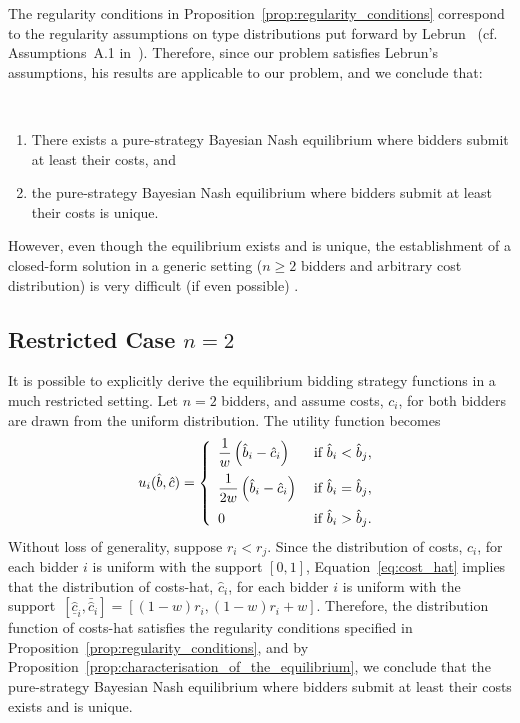 The regularity conditions in Proposition~\ref{prop:regularity_conditions} correspond to the regularity assumptions on type distributions put forward by Lebrun~\cite{Lebrun2006} (cf. Assumptions~A.1 in~\cite{Lebrun2006}). Therefore, since our problem satisfies Lebrun's assumptions, his results are applicable to our problem, and we conclude that:
\begin{proposition}
\label{prop:characterisation_of_the_equilibrium}
$\quad$\\
\begin{enumerate}
  \item There exists a pure-strategy Bayesian Nash equilibrium where bidders submit at least their costs, and
  \item the pure-strategy Bayesian Nash equilibrium where bidders submit at least their costs is unique.
\end{enumerate}
\end{proposition}

However, even though the equilibrium exists and is unique, the establishment of a closed-form solution in a generic setting ($n\ge 2$ bidders and arbitrary cost distribution) is very difficult (if even possible) \cite{Lebrun2006, Krishna10}.

\subsection{Restricted Case $n=2$} %
\label{sub:indirect_restricted_case_n_2_}
It is possible to explicitly derive the equilibrium bidding strategy functions in a much restricted setting. Let $n=2$ bidders, and assume costs, $c_i$, for both bidders are drawn from the uniform distribution. The utility function becomes
\begin{equation*}
  u_i(\hat{b},\hat{c}) = \left\{
	\begin{array}{l l}
		\displaystyle\frac{1}{w}\left(\hat{b}_i-\hat{c}_i\right) & \;\text{if } \hat{b}_i < \hat{b}_j,\\[2ex]
		\displaystyle\frac{1}{2w}\left(\hat{b}_i-\hat{c}_i\right) & \;\text{if } \hat{b}_i = \hat{b}_j,\\[2ex]
		0 & \;\text{if } \hat{b}_i > \hat{b}_j.
	\end{array}\right.
\end{equation*}
Without loss of generality, suppose $r_i < r_j$. Since the distribution of costs, $c_i$, for each bidder $i$ is uniform with the support $[0,1]$, Equation~\eqref{eq:cost_hat} implies that the distribution of costs-hat, $\hat{c}_i$, for each bidder $i$ is uniform with the support~${[\underline{\hat{c}}_i, \bar{\hat{c}}_i]} = {[(1-w)r_i, (1-w)r_i + w]}$. Therefore, the distribution function of costs-hat satisfies the regularity conditions specified in Proposition~\ref{prop:regularity_conditions}, and by Proposition~\ref{prop:characterisation_of_the_equilibrium}, we conclude that the pure-strategy Bayesian Nash equilibrium where bidders submit at least their costs exists and is unique.

